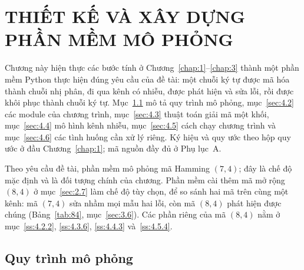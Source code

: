 \chapter{THIẾT KẾ VÀ XÂY DỰNG PHẦN MỀM MÔ PHỎNG}
\label{chap:4}
\begingroup
\setlength{\emergencystretch}{2em}

Chương này hiện thực các bước tính ở Chương~\ref{chap:1}--\ref{chap:3} thành
một phần mềm Python thực hiện đúng yêu cầu của đề tài: một chuỗi ký tự được mã
hóa thành chuỗi nhị phân, đi qua kênh có nhiễu, được phát hiện và sửa lỗi, rồi
được khôi phục thành chuỗi ký tự. Mục~\ref{sec:4.1} mô tả quy trình mô phỏng,
mục~\ref{sec:4.2} các module của chương trình, mục~\ref{sec:4.3} thuật toán
giải mã một khối, mục~\ref{sec:4.4} mô hình kênh nhiễu, mục~\ref{sec:4.5} cách
chạy chương trình và mục~\ref{sec:4.6} các tình huống cần xử lý riêng. Ký hiệu
và quy ước theo hộp quy ước ở đầu Chương~\ref{chap:1}; mã nguồn đầy đủ ở Phụ
lục~A.

Theo yêu cầu đề tài, phần mềm mô phỏng mã Hamming $(7,4)$; đây là chế độ mặc
định và là đối tượng chính của chương. Phần mềm cài thêm mã mở rộng $(8,4)$ ở
mục~\ref{sec:2.7} làm chế độ tùy chọn, để so sánh hai mã trên cùng một kênh: mã
$(7,4)$ sửa nhầm mọi mẫu hai lỗi, còn mã $(8,4)$ phát hiện được chúng
(Bảng~\ref{tab:84}, mục~\ref{sec:3.6}). Các phần riêng của mã $(8,4)$ nằm ở
mục~\ref{ss:4.2.2}, \ref{ss:4.3.6}, \ref{ss:4.4.3} và~\ref{ss:4.5.4}.

\section{Quy trình mô phỏng}
\label{sec:4.1}

